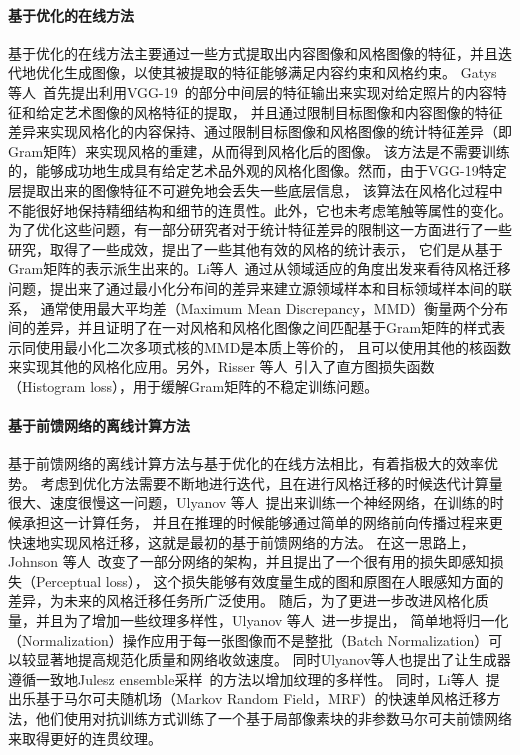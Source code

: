 \paragraph{基于优化的在线方法}
基于优化的在线方法主要通过一些方式提取出内容图像和风格图像的特征，并且迭代地优化生成图像，以使其被提取的特征能够满足内容约束和风格约束。
Gatys 等人~\cite{gatys2016image,gatys2017controlling}首先提出利用VGG-19~\cite{simonyan2015very}的部分中间层的特征输出来实现对给定照片的内容特征和给定艺术图像的风格特征的提取，
并且通过限制目标图像和内容图像的特征差异来实现风格化的内容保持、通过限制目标图像和风格图像的统计特征差异（即Gram矩阵）来实现风格的重建，从而得到风格化后的图像。
该方法是不需要训练的，能够成功地生成具有给定艺术品外观的风格化图像。然而，由于VGG-19特定层提取出来的图像特征不可避免地会丢失一些底层信息，
该算法在风格化过程中不能很好地保持精细结构和细节的连贯性。此外，它也未考虑笔触等属性的变化。
为了优化这些问题，有一部分研究者对于统计特征差异的限制这一方面进行了一些研究，取得了一些成效，提出了一些其他有效的风格的统计表示，
它们是从基于Gram矩阵的表示派生出来的。Li等人~\cite{li2017demystifying}通过从领域适应的角度出发来看待风格迁移问题，提出来了通过最小化分布间的差异来建立源领域样本和目标领域样本间的联系，
通常使用最大平均差（Maximum Mean Discrepancy，MMD）衡量两个分布间的差异，并且证明了在一对风格和风格化图像之间匹配基于Gram矩阵的样式表示同使用最小化二次多项式核的MMD是本质上等价的，
且可以使用其他的核函数来实现其他的风格化应用。另外，Risser 等人~\cite{risser2017stable}引入了直方图损失函数（Histogram loss），用于缓解Gram矩阵的不稳定训练问题。

\paragraph{基于前馈网络的离线计算方法}
基于前馈网络的离线计算方法与基于优化的在线方法相比，有着指极大的效率优势。
考虑到优化方法需要不断地进行迭代，且在进行风格迁移的时候迭代计算量很大、速度很慢这一问题，Ulyanov 等人~\cite{ulyanov2016texture}提出来训练一个神经网络，在训练的时候承担这一计算任务，
并且在推理的时候能够通过简单的网络前向传播过程来更快速地实现风格迁移，这就是最初的基于前馈网络的方法。
在这一思路上，Johnson 等人~\cite{johnson2016perceptual}改变了一部分网络的架构，并且提出了一个很有用的损失即感知损失（Perceptual loss），
这个损失能够有效度量生成的图和原图在人眼感知方面的差异，为未来的风格迁移任务所广泛使用。
随后，为了更进一步改进风格化质量，并且为了增加一些纹理多样性，Ulyanov 等人~\cite{ulyanov2017improved}进一步提出，
简单地将归一化（Normalization）操作应用于每一张图像而不是整批（Batch Normalization）可以较显著地提高规范化质量和网络收敛速度。
同时Ulyanov等人也提出了让生成器遵循一致地Julesz ensemble采样~\cite{zhu2000exploring}的方法以增加纹理的多样性。
同时，Li等人~\cite{li2016precomputed}提出乐基于马尔可夫随机场（Markov Random Field，MRF）的快速单风格迁移方法，他们使用对抗训练方式训练了一个基于局部像素块的非参数马尔可夫前馈网络来取得更好的连贯纹理。

